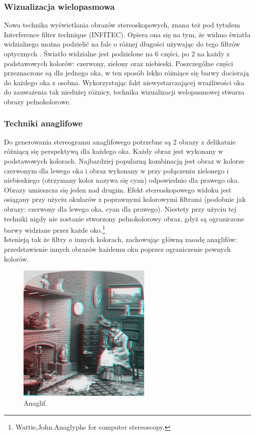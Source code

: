 \subsubsection{Wizualizacja wielopasmowa}
Nowa technika wyświetlania obrazów stereoskopowych, znana też pod tytułem Interference filter technique (INFITEC). Opiera ona się na tym, że widmo światła widzialnego można podzielić na fale o różnej długości używając do tego filtrów optycznych \cite{infitec}.
 Światło widzialne jest podzielone na 6 części, po 2 na każdy z podstawowych kolorów: czerwony, zielony oraz niebieski. Poszczególne części przeznaczone są dla jednego oka, w ten sposób lekko różniące się barwy docierają do każdego oka z osobna. Wykorzystując fakt niewystarczającej wrażliwości oka do zauważenia tak niedużej różnicy, technika wizualizacji welopasmowej stwarza obrazy pełnokolorowe.  


\subsubsection{Techniki anaglifowe}
Do generowania stereogramu anaglifowego potrzebne są 2 obrazy z delikatnie różniącą się perspektywą dla każdego oka. Każdy obraz jest wykonany w podstawowych kolorach. Najbardziej popularną kombinacją jest obraz w kolorze czerwonym dla lewego oka i obraz wykonany w przy połączeniu zielonego i niebieskiego (otrzymany kolor nazywa się cyan) odpowiednio dla prawego oka. Obrazy umieszcza się jeden nad drugim. Efekt stereoskopowego widoku jest osiągany przy użyciu okularów z poprawnymi kolorowymi filtrami (podobnie jak obrazy: czerwony dla lewego oka, cyan dla prawego). Niestety przy użyciu tej techniki nigdy nie zostanie stworzony pełnokolorowy obraz, gdyż są ograniczone barwy widziane przez każde oko.\footnote{Wattie,John.Anaglyphs for computer stereoscopy.} \\
Istenieją tak że filtry o innych kolorach, zachowując główną zasadę anaglifów: przedstawienie innych obrazów każdemu oku poprzez ograniczenie pewnych kolorów. \\

\begin{figure}[H]
		\centering
 		\includegraphics[width=6.5cm]{anaglif.jpg}
    	\caption{Anaglif.}
 		\label{rys1}
\end{figure}

